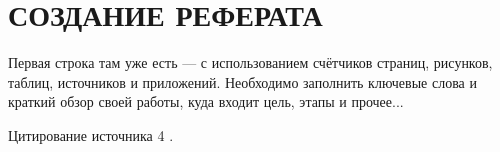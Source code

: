 \section{СОЗДАНИЕ РЕФЕРАТА}

Первая строка там уже есть --- с использованием счётчиков страниц, рисунков, 
таблиц, источников и приложений. 
Необходимо заполнить ключевые слова и краткий обзор своей работы, 
куда входит цель, этапы и прочее...

\lipsum[3-4]

Цитирование источника 4 \cite{Wikipedia4} \cite{cite_1_2} \cite{cite_1_15} \cite{cite_1_16}.

